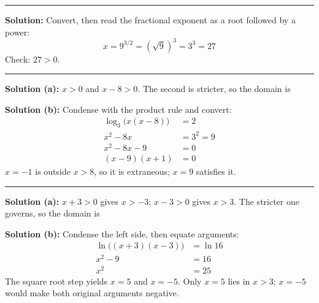 \documentclass[12pt]{article}
\begin{document}
\vspace{0.1cm}\noindent\rule{\linewidth}{0.2pt}


\textbf{Solution:} Convert, then read the fractional exponent as a root followed by a power:
\[ x = 9^{3/2} = \left(\sqrt{9}\right)^{3} = 3^{3} = 27 \]
Check: $27 > 0$. 

\vspace{0.1cm}\noindent\rule{\linewidth}{0.2pt}


\textbf{Solution (a):} $x > 0$ and $x - 8 > 0$. The second is stricter, so the domain is 

\textbf{Solution (b):} Condense with the product rule and convert:
\begin{align*}
  \log_{3}\bigl(x(x - 8)\bigr) &= 2 \\
  x^{2} - 8x &= 3^{2} = 9 \\
  x^{2} - 8x - 9 &= 0 \\
  (x - 9)(x + 1) &= 0
\end{align*}
$x = -1$ is outside $x > 8$, so it is extraneous; $x = 9$ satisfies it. 

\vspace{0.1cm}\noindent\rule{\linewidth}{0.2pt}


\textbf{Solution (a):} $x + 3 > 0$ gives $x > -3$; $x - 3 > 0$ gives $x > 3$. The stricter one governs, so the domain is 

\textbf{Solution (b):} Condense the left side, then equate arguments:
\begin{align*}
  \ln\bigl((x + 3)(x - 3)\bigr) &= \ln 16 \\
  x^{2} - 9 &= 16 \\
  x^{2} &= 25
\end{align*}
The square root step yields $x = 5$ and $x = -5$. Only $x = 5$ lies in $x > 3$; $x = -5$ would make both original arguments negative. 
\end{document}
